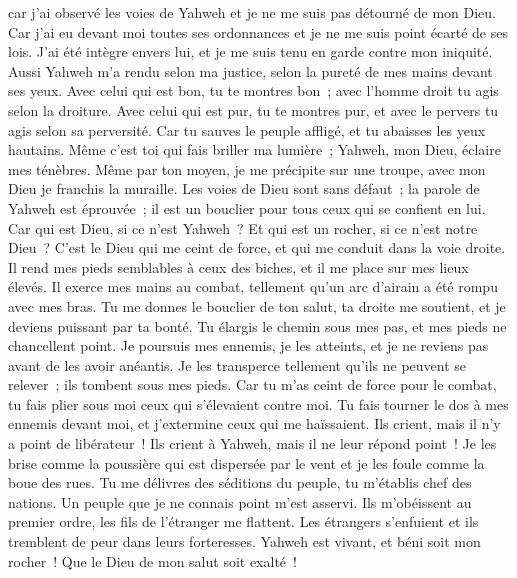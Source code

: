\begin{multicols}{2}
car j'ai observé les voies de Yahweh et je ne me suis pas détourné de mon Dieu.
Car j'ai eu devant moi toutes ses ordonnances et je ne me suis point écarté de ses lois.
J'ai été intègre envers lui, et je me suis tenu en garde contre mon iniquité.
Aussi Yahweh m'a rendu selon ma justice, selon la pureté de mes mains devant ses yeux.
Avec celui qui est bon, tu te montres bon~; avec l'homme droit tu agis selon la droiture.
Avec celui qui est pur, tu te montres pur, et avec le pervers tu agis selon sa perversité.
Car tu sauves le peuple affligé, et tu abaisses les yeux hautains.
Même c'est toi qui fais briller ma lumière~; Yahweh, mon Dieu, éclaire mes ténèbres.
Même par ton moyen, je me précipite sur une troupe, avec mon Dieu je franchis la muraille.
Les voies de Dieu sont sans défaut~; la parole de Yahweh est éprouvée~; il est un bouclier pour tous ceux qui se confient en lui.
Car qui est Dieu, si ce n'est Yahweh~? Et qui est un rocher, si ce n'est notre Dieu~?
C'est le Dieu qui me ceint de force, et qui me conduit dans la voie droite.
Il rend mes pieds semblables à ceux des biches, et il me place sur mes lieux élevés.
Il exerce mes mains au combat, tellement qu'un arc d'airain a été rompu avec mes bras.
Tu me donnes le bouclier de ton salut, ta droite me soutient, et je deviens puissant par ta bonté.
Tu élargis le chemin sous mes pas, et mes pieds ne chancellent point.
Je poursuis mes ennemis, je les atteints, et je ne reviens pas avant de les avoir anéantis.
Je les transperce tellement qu'ils ne peuvent se relever~; ils tombent sous mes pieds.
Car tu m'as ceint de force pour le combat, tu fais plier sous moi ceux qui s'élevaient contre moi.
Tu fais tourner le dos à mes ennemis devant moi, et j'extermine ceux qui me haïssaient.
Ils crient, mais il n'y a point de libérateur~! Ils crient à Yahweh, mais il ne leur répond point~!
Je les brise comme la poussière qui est dispersée par le vent et je les foule comme la boue des rues.
Tu me délivres des séditions du peuple, tu m'établis chef des nations. Un peuple que je ne connais point m'est asservi.
Ils m'obéissent au premier ordre, les fils de l'étranger me flattent.
Les étrangers s'enfuient et ils tremblent de peur dans leurs forteresses.
Yahweh est vivant, et béni soit mon rocher~! Que le Dieu de mon salut soit exalté~!

\end{multicols}
